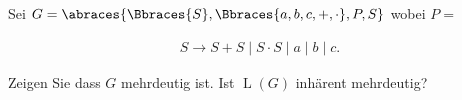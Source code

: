 
\begin{exercise}

Sei $G = \abraces{\Bbraces{S}, \Bbraces{a, b, c, +, \cdot}, P, S}$ wobei $P =$

\begin{align*}
    S \to S + S \mid S \cdot S \mid a \mid b \mid c.
\end{align*}

Zeigen Sie dass $G$ mehrdeutig ist.
Ist $\operatorname L(G)$ inhärent mehrdeutig?

\end{exercise}


